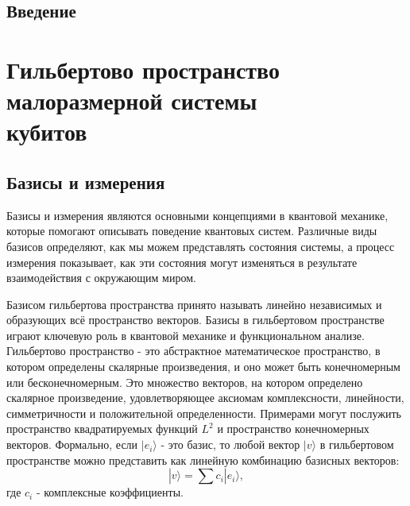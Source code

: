 \documentclass[a4paper]{report}
\begin{document}
\tableofcontents
\newpage


\section*{Введение}


\chapter{Гильбертово пространство малоразмерной системы \\кубитов}


\section{Базисы и измерения}

Базисы и измерения являются основными концепциями в квантовой механике, которые помогают описывать поведение квантовых систем. Различные виды базисов определяют, как мы можем представлять состояния системы, а процесс измерения показывает, как эти состояния могут изменяться в результате взаимодействия с окружающим миром.

Базисом гильбертова пространства принято называть линейно независимых и образующих всё пространство векторов. Базисы в гильбертовом пространстве играют ключевую роль в квантовой механике и функциональном анализе. Гильбертово пространство - это абстрактное математическое пространство, в котором определены скалярные произведения, и оно может быть конечномерным или бесконечномерным. Это множество векторов, на котором определено скалярное произведение, удовлетворяющее аксиомам комплексности, линейности, симметричности и положительной определенности. Примерами могут послужить пространство квадратируемых функций ${L^2}$ и пространство конечномерных векторов. Формально, если ${{|e_i\rangle}}$ - это базис, то любой вектор ${|v\rangle}$ в гильбертовом пространстве можно представить как линейную комбинацию базисных векторов:
    \begin{equation}\label{}
    |v\rangle=\sum c_i |e_i\rangle,
    \nonumber
    \end{equation}
где ${c_i}$ - комплексные коэффициенты.
\end{document}
